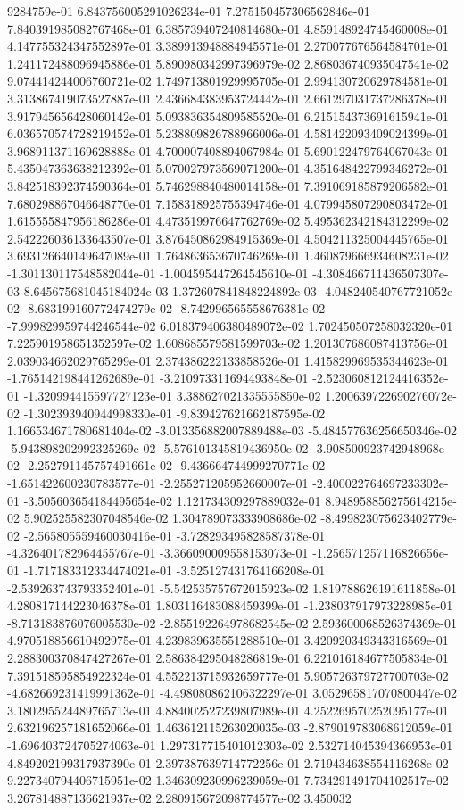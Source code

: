9284759e-01	6.843756005291026234e-01	7.275150457306562846e-01	7.840391985082767468e-01	6.385739407240814680e-01	4.859148924745460008e-01	4.147755324347552897e-01	3.389913948884945571e-01	2.270077676564584701e-01	1.241172488096945886e-01	5.890980342997396979e-02	2.868036740935047541e-02	9.074414244006760721e-02	1.749713801929995705e-01	2.994130720629784581e-01	3.313867419073527887e-01	2.436684383953724442e-01	2.661297031737286378e-01	3.917945656428060142e-01	5.093836354809585520e-01	6.215154373691615941e-01	6.036570574728219452e-01	5.238809826788966006e-01	4.581422093409024399e-01	3.968911371169628888e-01	4.700007408894067984e-01	5.690122479764067043e-01	5.435047363638212392e-01	5.070027973569071200e-01	4.351648422799346272e-01	3.842518392374590364e-01	5.746298840480014158e-01	7.391069185879206582e-01	7.680298867046648770e-01	7.158318925755394746e-01	4.079945807290803472e-01	1.615555847956186286e-01	4.473519976647762769e-02	5.495362342184312299e-02	2.542226036133643507e-01	3.876450862984915369e-01	4.504211325004445765e-01	3.693126640149647089e-01	1.764863653670746269e-01	1.460879666934608231e-02	-1.301130117548582044e-01	-1.004595447264545610e-01	-4.308466711436507307e-03	8.645675681045184024e-03	1.372607841848224892e-03	-4.048240540767721052e-02	-8.683199160772474279e-02	-8.742996565558676381e-02	-7.999829959744246544e-02	6.018379406380489072e-02	1.702450507258032320e-01	7.225901958651352597e-02	1.608685579581599703e-02	1.201307686087413756e-01	2.039034662029765299e-01	2.374386222133858526e-01	1.415829969535344623e-01	-1.765142198441262689e-01	-3.210973311694493848e-01	-2.523060812124416352e-01	-1.320994415597727123e-01	3.388627021335555850e-02	1.200639722690276072e-02	-1.302393940944998330e-01	-9.839427621662187595e-02	1.166534671780681404e-02	-3.013356882007889488e-03	-5.484577636256650346e-02	-5.943898202992325269e-02	-5.576101345819436950e-02	-3.908500923742948968e-02	-2.252791145757491661e-02	-9.436664744999270771e-02	-1.651422600230783577e-01	-2.255271205952660007e-01	-2.400022764697233302e-01	-3.505603654184495654e-02	1.121734309297889032e-01	8.948958856275614215e-02	5.902525582307048546e-02	1.304789073333908686e-02	-8.499823075623402779e-02	-2.565805559460030416e-01	-3.728293495828587378e-01	-4.326401782964455767e-01	-3.366090009558153073e-01	-1.256571257116826656e-01	-1.717183312334474021e-01	-3.525127431764166208e-01	-2.539263743793352401e-01	-5.542535757672015923e-02	1.819788626191611858e-01	4.280817144223046378e-01	1.803116483088459399e-01	-1.238037917973228985e-01	-8.713183876076005530e-02	-2.855192264978682545e-02	2.593600068526374369e-01	4.970518856610492975e-01	4.239839635551288510e-01	3.420920349343316569e-01	2.288300370847427267e-01	2.586384295048286819e-01	6.221016184677505834e-01	7.391518595854922324e-01	4.552213715932659777e-01	5.905726379727700703e-02	-4.682669231419991362e-01	-4.498080862106322297e-01	3.052965817070800447e-02	3.180295524489765713e-01	4.884002527239807989e-01	4.252269570252095177e-01	2.632196257181652066e-01	1.463612115263020035e-03	-2.879019783068612059e-01	-1.696403724705274063e-01	1.297317715401012303e-02	2.532714045394366953e-01	4.849202199317937390e-01	2.397387639714772256e-01	2.719434638554116268e-02	9.227340794406715951e-02	1.346309230996239059e-01	7.734291491704102517e-02	3.267814887136621937e-02	2.280915672098774577e-02	3.450032